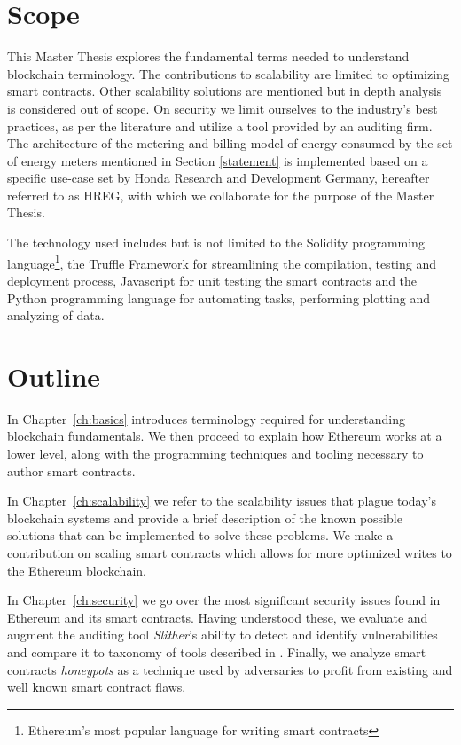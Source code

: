 \section{Scope}
This Master Thesis explores the fundamental terms needed to understand blockchain terminology. The contributions to scalability are limited to optimizing smart contracts. Other scalability solutions are mentioned but in depth analysis is considered out of scope. On security we limit ourselves to the industry's best practices, as per the literature and utilize a tool provided by an auditing firm. The architecture of the metering and billing model of energy consumed by the set of energy meters mentioned in Section \ref{statement} is implemented based on a specific use-case set by Honda Research and Development Germany, hereafter referred to as HREG, with which we collaborate for the purpose of the Master Thesis.

The technology used includes but is not limited to the Solidity programming language\footnote{Ethereum's most popular language for writing smart contracts}, the Truffle Framework for streamlining the compilation, testing and deployment process, Javascript for unit testing the smart contracts and the Python programming language for automating tasks, performing plotting and analyzing of data.


\section{Outline}

In Chapter~\ref{ch:basics} introduces terminology required for understanding blockchain fundamentals. We then proceed to explain how Ethereum works at a lower level, along with the programming techniques and tooling necessary to author smart contracts.

In Chapter~\ref{ch:scalability} we refer to the scalability issues that plague today's blockchain systems and provide a brief description of the known possible solutions that can be implemented to solve these problems. We make a contribution on scaling smart contracts which allows for more optimized writes to the Ethereum blockchain.

In Chapter~\ref{ch:security} we go over the most significant security issues found in Ethereum and its smart contracts. Having understood these, we evaluate and augment the auditing tool \textit{Slither}'s ability to detect and identify vulnerabilities and compare it to taxonomy of tools described in \cite{tools}. Finally, we analyze smart contracts \textit{honeypots} as a technique used by adversaries to profit from existing and well known smart contract flaws.

